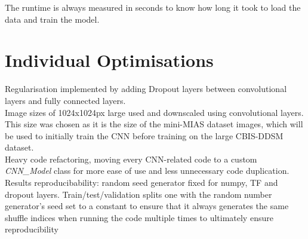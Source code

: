 The runtime is always measured in seconds to know how long it took to load the data and train the model.


\section{Individual Optimisations}

Regularisation implemented by adding Dropout layers between convolutional layers and fully connected layers.\\

Image sizes of 1024x1024px large used and downscaled using convolutional layers. This size was chosen as it is the size of the mini-MIAS dataset images, which will be used to initially train the CNN before training on the large CBIS-DDSM dataset.\\

Heavy code refactoring, moving every CNN-related code to a custom \textit{CNN\_Model} class for more ease of use and less unnecessary code duplication.\\

Results reproducibability:
random seed generator fixed for numpy, TF and dropout layers. Train/test/validation splits one with the random number generator’s seed set to a constant to ensure that it always generates the same shuffle indices when running the code multiple times to ultimately ensure reproducibility






